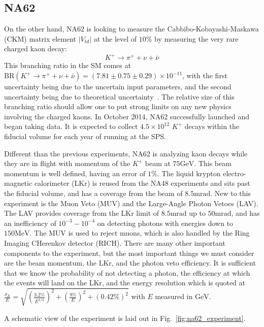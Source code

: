 \subsection{NA62}
On the other hand, NA62 is looking to measure the Cabbibo-Kobayashi-Maskawa (CKM) matrix element $|V_{td}|$ at the level of $10\%$ by measuring the very rare charged kaon decay:
\begin{equation}
K^+ \rightarrow \pi^+ + \nu + \bar{\nu}
\end{equation}
This branching ratio in the SM comes at $\textrm{BR}(K^+ \rightarrow \pi^+ + \nu + \bar{\nu}) = (7.81 \pm 0.75 \pm 0.29) \times 10^{-11}$, with the first uncertainty being due to the uncertain input parameters, and the second uncertainty being due to theoretical uncertainty~\cite{Straub:2010ih}.
The relative size of this branching ratio should allow one to put strong limits on any new physics involving the charged kaons.
In October 2014, NA62 successfully launched and began taking data.
It is expected to collect $4.5 \times 10^{12}$ $K^+$ decays within the fiducial volume for each year of running at the SPS.

Different than the previous experiments, NA62 is analyzing kaon decays while they are in flight with momentum of the $K^+$ beam at $75\textrm{GeV}$.
This beam momentum is well defined, having an error of $1\%$.
The liquid krypton electro-magnetic calorimeter (LKr) is reused from the NA48 experiments and sits past the fiducial volume, and has a coverage from the beam of $8.5\textrm{mrad}$.
New to this experiment is the Muon Veto (MUV) and the Large-Angle Photon Vetoes (LAV).
The LAV provides coverage from the LKr limit of $8.5\textrm{mrad}$ up to $50\textrm{mrad}$, and has an inefficiency of $10^{-3} - 10^{-4}$ on detecting photons with energies down to $150\textrm{MeV}$.
The MUV is used to reject muons, which is also handled by the Ring Imaging CHerenkov detector (RICH).
There are many other important components to the experiment, but the most important things we must consider are the beam momentum, the LKr, and the photon veto efficiency.
It is sufficient that we know the probability of not detecting a photon, the efficiency at which the events will land on the LKr, and the energy resolution which is quoted at $\frac{\sigma_E}{E} = \sqrt{\left(\frac{3.2\%}{E^{1/2}}\right)^2 + \left(\frac{9\%}{E}\right)^2 + (0.42\%)^2}$ with $E$ measured in $\textrm{GeV}$.

A schematic view of the experiment is laid out in Fig.~\ref{fig:na62_experiment}.

